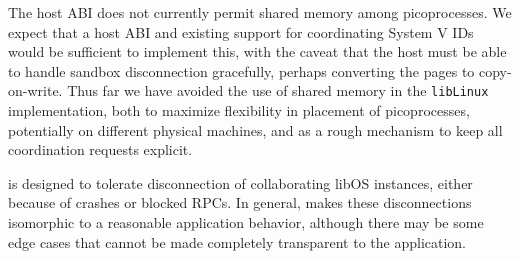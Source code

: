\vspace{5pt}
 The \sysname{} host ABI 
does not currently permit shared memory among picoprocesses.
We expect that a host ABI and existing support for coordinating System V IDs would be sufficient to implement this,
with the caveat that the host must be able to handle sandbox disconnection gracefully, perhaps converting the pages to copy-on-write.
Thus far we have avoided the use of shared memory in the {\tt libLinux} implementation, both to maximize flexibility in placement of picoprocesses, potentially on different physical machines,
and as a rough mechanism to keep all coordination requests explicit.



 
\begin{comment}
\paragraph{Limitations.} At the time of submission,
\sysname{} does not recover from all cases where a leader picoprocess crashes.
Our current prototype requires the IPC helper thread in the leader to remain 
in the sandbox and respond to messages even if its process {\tt main} routine has completed,
and the evaluation data reflects this state.
\end{comment}

\vspace{5pt}
\sysname{} is designed to tolerate disconnection of collaborating libOS instances,
either because of crashes or blocked RPCs.  In general, \sysname{} makes 
these disconnections isomorphic to a reasonable application behavior,
although there may be some edge cases that cannot be made completely transparent to the application.

